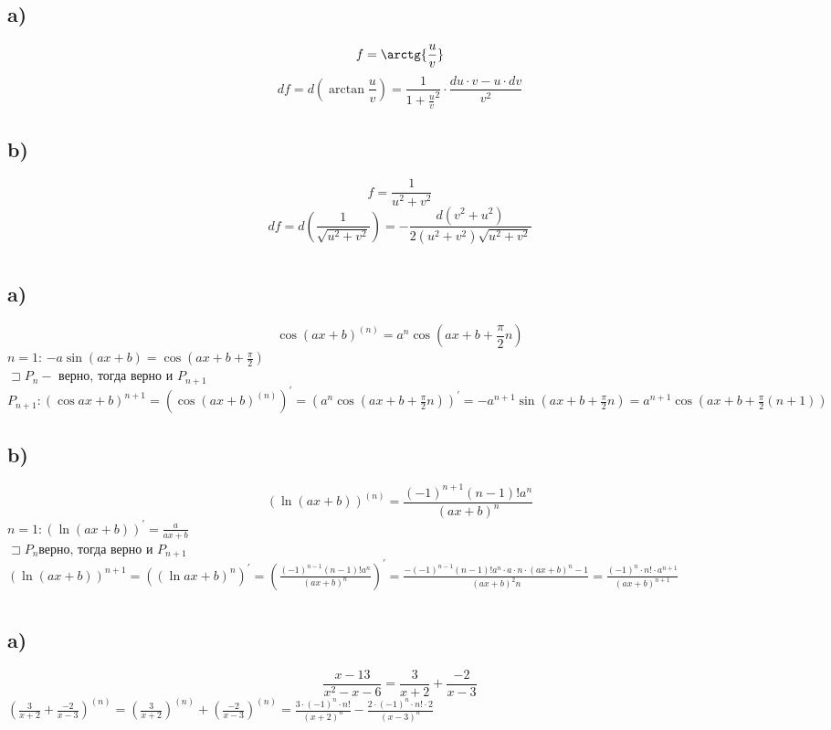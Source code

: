 

	\section{}
	\subsection*{a)}
	$$f = \arctg{\frac{u}{v}}$$
	$$df = d(\arctan{\frac{u}{v}}) = \frac{1}{1+\frac{u}{v}^2}\cdot\frac{du\cdot v-u\cdot dv}{v^2}$$
	\subsection*{b)}
	$$f = \frac{1}{u^2+v^2}$$
	$$df = d(\frac{1}{\sqrt{u^2+v^2}}) = -\frac{d(v^2+u^2)}{2(u^2+v^2)\sqrt{u^2+v^2}}$$
	\section{}
	\subsection*{a)}
	$$\cos{(ax+b)}^{(n)} = a^n\cos{(ax+b+\frac{\pi}{2}n)}$$
	$n=1$: $-a\sin(ax+b) = \cos(ax+b+\frac{\pi}{2})$  \\
	$\sqsupset P_n - $ верно, тогда верно и $P_{n+1}$ \\
	$P_{n+1}: \left(\cos{ax+b}\right)^{n+1} = \left(\cos{(ax+b)}^{(n)}\right)^{'} = \left(a^n\cos{(ax+b+\frac{\pi}{2}n)}\right)^{'}=-a^{n+1}\sin{\left(ax+b+\frac{\pi}{2}n\right)}=a^{n+1}\cos{\left(ax+b+\frac{\pi}{2}(n+1)\right)}$
	\subsection*{b)}
	$$(\ln(ax+b))^{(n)} =\frac{(-1)^{n+1}(n-1)!a^n}{(ax+b)^n} $$
	$n=1: (\ln(ax+b))^{'} = \frac{a}{ax+b}$ \\
	$\sqsupset P_n \text{верно, тогда верно и } P_{n+1}	$
	$ (\ln(ax+b))^{n+1} = ((\ln{ax+b})^{n})^{'} = (\frac{(-1)^{n-1}(n-1)!a^{n}}{(ax+b)^n})^{'} = \frac{-(-1)^{n-1}(n-1)!a^n\cdot a\cdot n\cdot(ax+b)^n-1}{(ax+b)^2n} = \frac{(-1)^n\cdot n! \cdot a^{n+1}}{(ax+b)^{n+1}}$
	\section{}
	\subsection*{a)}
	$$\frac{x-13}{x^2-x-6} = \frac{3}{x+2}+\frac{-2}{x-3}$$
	$(\frac{3}{x+2}+\frac{-2}{x-3})^{(n)} =(\frac{3}{x+2})^{(n)} + (\frac{-2}{x-3})^{(n)} =  \frac{3\cdot(-1)^n\cdot n!}{(x+2)^n} -\frac{2\cdot(-1)^n\cdot n! \cdot2}{(x-3)^n} $
